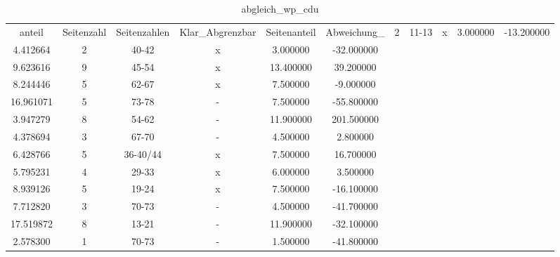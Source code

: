 \begin{table}
\caption{abgleich_wp_cdu}
\label{tab:abgleich_wp_cdu}
\begin{tabular}{c|c|c|c|c|c|c}
\toprule
anteil & Seitenzahl & Seitenzahlen & Klar_Abgrenzbar & Seitenanteil & Abweichung_%
 & 2 & 11-13 & x & 3.000000 & -13.200000 \\
4.412664 & 2 & 40-42 & x & 3.000000 & -32.000000 \\
9.623616 & 9 & 45-54 & x & 13.400000 & 39.200000 \\
8.244446 & 5 & 62-67 & x & 7.500000 & -9.000000 \\
16.961071 & 5 & 73-78 & - & 7.500000 & -55.800000 \\
3.947279 & 8 & 54-62 & - & 11.900000 & 201.500000 \\
4.378694 & 3 & 67-70 & - & 4.500000 & 2.800000 \\
6.428766 & 5 & 36-40/44 & x & 7.500000 & 16.700000 \\
5.795231 & 4 & 29-33 & x & 6.000000 & 3.500000 \\
8.939126 & 5 & 19-24 & x & 7.500000 & -16.100000 \\
7.712820 & 3 & 70-73 & - & 4.500000 & -41.700000 \\
17.519872 & 8 & 13-21 & - & 11.900000 & -32.100000 \\
2.578300 & 1 & 70-73 & - & 1.500000 & -41.800000 \\
\bottomrule
\end{tabular}
\end{table}
